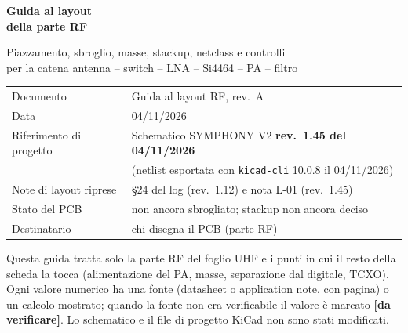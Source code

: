 \documentclass[a4paper,10pt]{article}
\newcommand{\dv}{\textcolor{verfr}{\textbf{[da verificare]}}}
\begin{document}
\begin{titlepage}
\thispagestyle{empty}

\vspace*{62mm}
{\sffamily\bfseries\fontsize{26}{31}\selectfont\color{sbblue} Guida al layout\\[2pt] della parte RF\par}
\vspace{6mm}
{\sffamily\large\color{sbgray} Piazzamento, sbroglio, masse, stackup, netclass e controlli\\
per la catena antenna -- switch -- LNA -- Si4464 -- PA -- filtro\par}

\vspace{14mm}
\begin{tcolorbox}[colback=black!3,colframe=black!35,boxrule=0.5pt,arc=1pt,width=0.86\linewidth,
                  left=8pt,right=8pt,top=6pt,bottom=6pt]
\sffamily\small
\begin{tabular}{@{}L{44mm}L{86mm}@{}}
Documento & Guida al layout RF, rev.~A\\
Data & 04/11/2026\\
Riferimento di progetto & Schematico SYMPHONY V2 \textbf{rev.~1.45 del 04/11/2026}\\
                        & (netlist esportata con \texttt{kicad-cli} 10.0.8 il 04/11/2026)\\
Note di layout riprese & \S24 del log (rev.~1.12) e nota L-01 (rev.~1.45)\\
Stato del PCB & non ancora sbrogliato; stackup non ancora deciso\\
Destinatario & chi disegna il PCB (parte RF)\\
\end{tabular}
\end{tcolorbox}

\vfill
{\small\color{sbgray}
Questa guida tratta solo la parte RF del foglio UHF e i punti in cui il resto della scheda la tocca
(alimentazione del PA, masse, separazione dal digitale, TCXO). Ogni valore numerico ha una fonte
(datasheet o application note, con pagina) o un calcolo mostrato; quando la fonte non era verificabile
il valore è marcato \dv. Lo schematico e il file di progetto KiCad non sono stati modificati.\par}
\end{titlepage}
\end{document}
